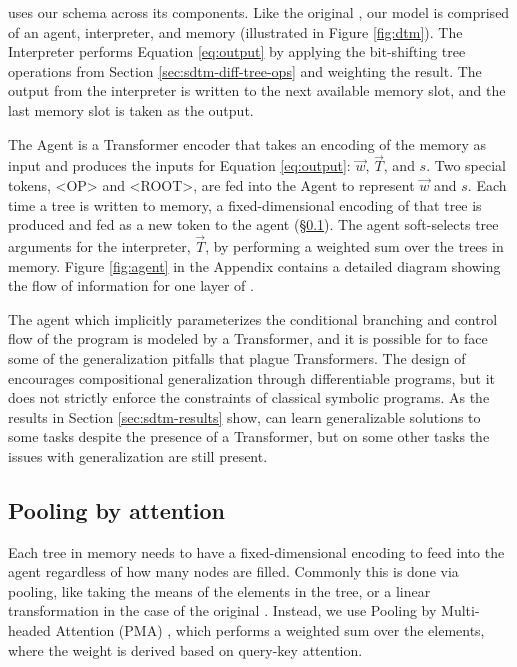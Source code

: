 \sdtm uses our \fullrepname schema across its components. Like the original \dtm, our model is comprised of an agent, interpreter, and memory (illustrated in Figure \ref{fig:dtm}). The Interpreter performs Equation \ref{eq:output} by applying the bit-shifting tree operations from Section \ref{sec:sdtm-diff-tree-ops} and weighting the result. The output from the interpreter is written to the next available memory slot, and the last memory slot is taken as the output.

The Agent is a Transformer encoder that takes an encoding of the memory as input and produces the inputs for Equation \ref{eq:output}: $\vec{w}$, $\vec{T}$, and $s$. Two special tokens, <OP> and <ROOT>, are fed into the Agent to represent $\vec{w}$ and $s$. Each time a tree is written to memory, a fixed-dimensional encoding of that tree is produced and fed as a new token to the agent (\S \ref{sec:sdtm-mha}). The agent soft-selects tree arguments for the interpreter, $\vec{T}$, by performing a weighted sum over the trees in memory. Figure \ref{fig:agent} in the Appendix contains a detailed diagram showing the flow of information for one layer of \sdtm.

The agent which implicitly parameterizes the conditional branching and control flow of the program is modeled by a Transformer, and it is possible for \sdtm to face some of the generalization pitfalls that plague Transformers. The design of \sdtm encourages compositional generalization through differentiable programs, but it does not strictly enforce the constraints of classical symbolic programs. As the results in Section \ref{sec:sdtm-results} show, \sdtm can learn generalizable solutions to some tasks despite the presence of a Transformer, but on some other tasks the issues with generalization are still present. 

\subsection{Pooling by attention} \label{sec:sdtm-mha}

Each tree in memory needs to have a fixed-dimensional encoding to feed into the agent regardless of how many nodes are filled. Commonly this is done via pooling, like taking the means of the elements in the tree, or a linear transformation in the case of the original \dtm. Instead, we use Pooling by Multi-headed Attention (PMA) \citep{pmlr-v97-lee19d}, which performs a weighted sum over the elements, where the weight is derived based on query-key attention.

